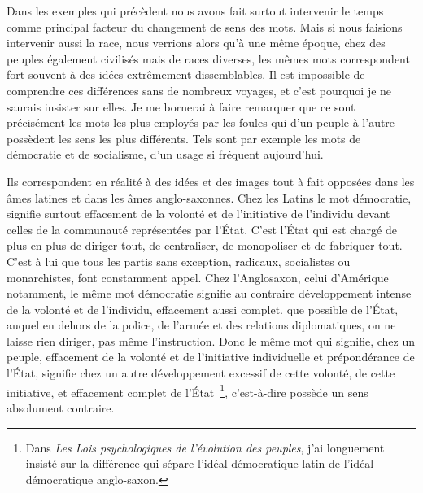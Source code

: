 \documentclass[french,twoside]{book} %
\begin{document}
Dans les exemples qui précèdent nous avons fait surtout intervenir le temps comme principal facteur du changement de sens des mots. Mais si nous faisions intervenir aussi la race, nous verrions alors qu’à une même époque, chez des peuples également civilisés mais de races diverses, les mêmes mots correspondent fort souvent à des idées extrêmement dissemblables. Il est impossible de comprendre ces différences sans de nombreux voyages, et c’est pourquoi je ne saurais insister sur elles. Je me bornerai à faire remarquer que ce sont précisément les mots les plus employés par les foules qui d’un peuple à l’autre possèdent les sens les plus différents. Tels sont par exemple les mots de démocratie et de socialisme, d’un usage si fréquent aujourd’hui.\par
Ils correspondent en réalité à des idées et des images tout à fait opposées dans les âmes latines et dans les âmes anglo-saxonnes. Chez les Latins le mot démocratie, signifie surtout effacement de la volonté et de l’initiative de l’individu devant celles de la communauté représentées par l’État. C’est l’État qui est chargé de plus en plus de diriger tout, de centraliser, de monopoliser et de fabriquer tout. C’est à lui que tous les partis sans exception, radicaux, socialistes ou monarchistes, font constamment appel. Chez l’Anglosaxon, celui d’Amérique notamment, le même mot démocratie signifie au contraire développement intense de la volonté et de l’individu, effacement aussi complet. que possible de l’État, auquel en dehors de la police, de l’armée et des rela­tions diplomatiques, on ne laisse rien diriger, pas même l’instruction. Donc le même mot qui signifie, chez un peuple, effacement de la volonté et de l’initiative individu­elle et prépondérance de l’État, signifie chez un autre développement excessif de cette volonté, de cette initiative, et effacement complet de l’État \footnote{Dans \emph{Les Lois psychologiques de l’évolution des peuples}, j’ai longuement insisté sur la différence qui sépare l’idéal démocratique latin de l’idéal démocratique anglo-saxon.}, c’est-à-dire possède un sens absolument contraire.
\end{document}
